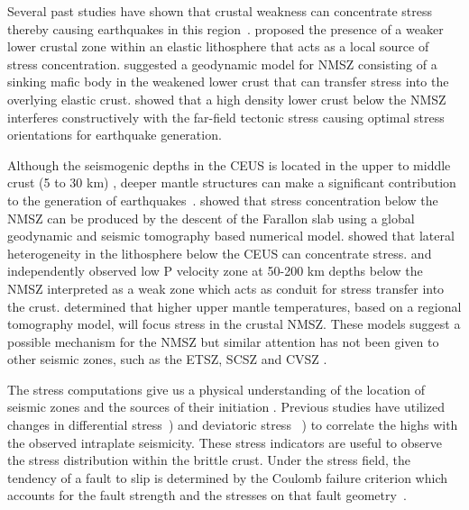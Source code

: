 \documentclass[draft,linenumbers]{agujournal2018}
\begin{document}
    
    Several past studies have shown that crustal weakness can concentrate stress thereby causing earthquakes in this region~\citep{Kenner_2000a, Pollitz_2001, levandowski2016dense}. \citet{Kenner_2000a} proposed the presence of a weaker lower crustal zone within an elastic lithosphere that acts as a local source of stress concentration. \citet{Pollitz_2001} suggested a geodynamic model for NMSZ consisting of a sinking mafic body in the weakened lower crust that can transfer stress into the overlying elastic crust. \citet{levandowski2016dense} showed that a high density lower crust below the NMSZ interferes constructively with the far-field tectonic stress causing optimal stress orientations for earthquake generation.
     
    Although the seismogenic depths in the CEUS is located in the upper to middle crust (5 to 30 km) \citep{vlahovic1998et1d, johnston1996seismic, mazzotti2010state}, deeper mantle structures can make a significant contribution to the generation of  earthquakes~\citep[e.g.,][]{forte2007descent, li2007stress, chen2014crust, nyamwandha2016joint, zhan2016stress}. \citet{forte2007descent} showed that stress concentration below the NMSZ can be produced by the descent of the Farallon slab using a global geodynamic and seismic tomography based numerical model. \citet{li2007stress} showed that lateral heterogeneity in the lithosphere below the CEUS can concentrate stress. \citet{chen2014crust} and \citet{nyamwandha2016joint} independently observed low P velocity zone at 50-200 km depths below the NMSZ interpreted as a weak zone which acts as conduit for stress transfer into the crust. \citet{zhan2016stress} determined that higher upper mantle temperatures, based on a regional tomography \citep{pollitz2014seismic}model, will focus stress in the crustal NMSZ. These models suggest a possible mechanism for the NMSZ but similar attention has not been given to other seismic zones, such as the ETSZ, SCSZ and CVSZ .
    
    The stress computations give us a physical understanding of the location of seismic zones and the sources of their initiation \citep{zoback1992stress, king1994static, stein1999role, bowman2001accelerating}. Previous studies have utilized changes in differential stress~\citep[e.g.,][]{baird2010relationship, zhan2016stress}) and deviatoric stress ~\citep[e.g.,][]{levandowski2016dense}) to correlate the highs with the observed intraplate seismicity. These stress indicators are useful to observe the stress distribution within the brittle crust. Under the stress field, the tendency of a fault to slip is determined by the Coulomb failure criterion which accounts for the fault strength and the stresses on that fault geometry~\citep{king1994static, freed2005earthquake, li2007stress}.
    
\end{document}

